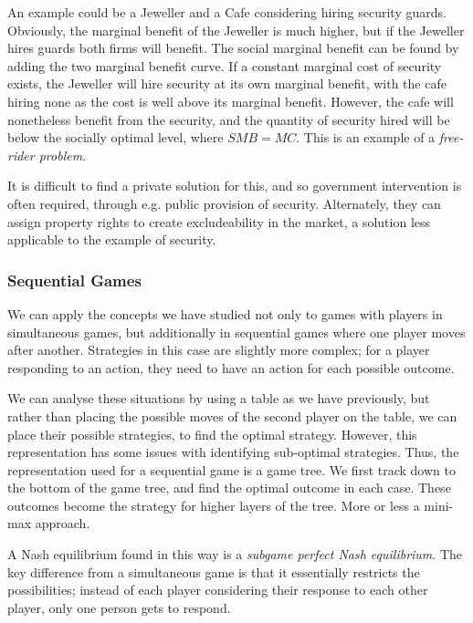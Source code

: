 \documentclass[12pt]{report}
\begin{document}
\begin{flushleft}
\bigskip
An example could be a Jeweller and a Cafe considering hiring security guards.
Obviously, the marginal benefit of the Jeweller is much higher, but if the
Jeweller hires guards both firms will benefit. The social marginal benefit
can be found by adding the two marginal benefit curve. If a constant marginal
cost of security exists, the Jeweller will hire security at its own marginal
benefit, with the cafe hiring none as the cost is well above its marginal
benefit. However, the cafe will nonetheless benefit from the security, and the
quantity of security hired will be below the socially optimal level, where 
\(SMB = MC\). This is an example of a \textit{free-rider problem}.

\bigskip
It is difficult to find a private solution for this, and so government 
intervention is often required, through e.g. public provision of security.
Alternately, they can assign property rights to create excludeability in the
market, a solution less applicable to the example of security.

\subsubsection*{Sequential Games}
We can apply the concepts we have studied not only to games with players in
simultaneous games, but additionally in sequential games where one player moves
after another. Strategies in this case are slightly more complex; for a player
responding to an action, they need to have an action for each possible outcome.

\bigskip
We can analyse these situations by using a table as we have previously, but
rather than placing the possible moves of the second player on the table, we
can place their possible strategies, to find the optimal strategy. However, 
this representation has some issues with identifying sub-optimal strategies.
Thus, the representation used for a sequential game is a game tree. We first
track down to the bottom of the game tree, and find the optimal outcome in each
case. These outcomes become the strategy for higher layers of the tree. More or
less a mini-max approach.

\bigskip
A Nash equilibrium found in this way is a \textit{subgame perfect Nash 
equilibrium}. The key difference from a simultaneous game is that it 
essentially restricts the possibilities; instead of each player considering
their response to each other player, only one person gets to respond.

\end{flushleft}
\end{document}
